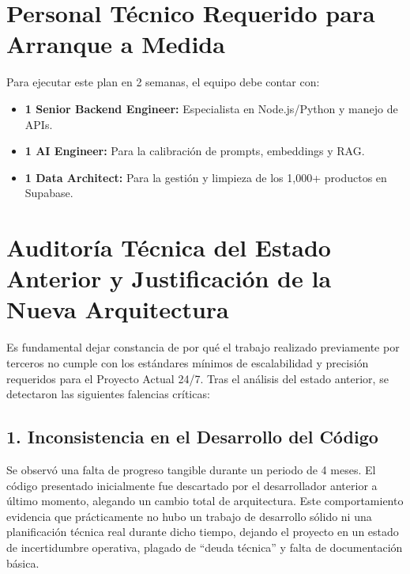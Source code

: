 \documentclass[12pt,a4paper]{article}
\begin{document}
\section{Personal Técnico Requerido para Arranque a Medida}
Para ejecutar este plan en 2 semanas, el equipo debe contar con:
\begin{itemize}
    \item \textbf{1 Senior Backend Engineer:} Especialista en Node.js/Python y manejo de APIs.
    \item \textbf{1 AI Engineer:} Para la calibración de prompts, embeddings y RAG.
    \item \textbf{1 Data Architect:} Para la gesti\'on y limpieza de los 1,000+ productos en Supabase.
\end{itemize}

\newpage

\section{Auditoría Técnica del Estado Anterior y Justificación de la Nueva Arquitectura}
Es fundamental dejar constancia de por qué el trabajo realizado previamente por terceros no cumple con los est\'andares mínimos de escalabilidad y precisi\'on requeridos para el Proyecto Actual 24/7. Tras el an\'alisis del estado anterior, se detectaron las siguientes falencias cr\'iticas:

\subsection{1. Inconsistencia en el Desarrollo del Código}
Se observó una falta de progreso tangible durante un periodo de 4 meses. El código presentado inicialmente fue descartado por el desarrollador anterior a último momento, alegando un cambio total de arquitectura. Este comportamiento evidencia que prácticamente no hubo un trabajo de desarrollo sólido ni una planificación t\'ecnica real durante dicho tiempo, dejando el proyecto en un estado de incertidumbre operativa, plagado de ``deuda t\'ecnica'' y falta de documentación básica.
\end{document}
